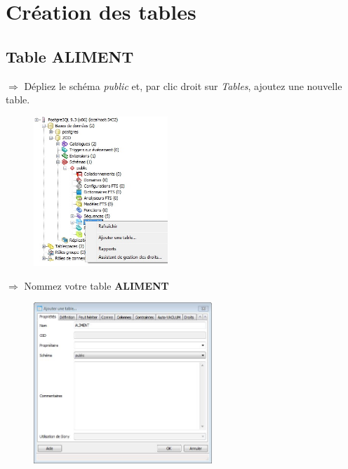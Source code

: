 \documentclass[11pt]{article}
\newcommand{\action}{$\Rightarrow$ }
\begin{document}
	
\section{Création des tables}
\subsection{Table ALIMENT}
\action Dépliez le schéma \textit{public} et, par clic droit sur \textit{Tables}, ajoutez une nouvelle table.
\begin{figure}[H]
	\center \includegraphics[width=0.45\textwidth]{img/pgadmin_ajouter_table-1.jpg}\\[1em]
\end{figure}
			
\action Nommez votre table \textbf{ALIMENT}
\begin{figure}[H]
	\center \includegraphics[width=0.6\textwidth]{img/pgadmin_ajouter_table-2.jpg}\\[1em]
\end{figure}
			
\end{document}
